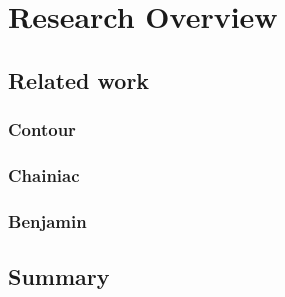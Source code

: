 \documentclass[../Main/thesis.tex]{subfiles}
\begin{document}
\chapter{Research Overview}\label{ch:research_overview}

\section{Related work}\label{sec:related}
\subsection{Contour}\label{sec:contour}

\subsection{Chainiac}\label{sec:chainiac}

\subsection{Benjamin}\label{sec:benjamin}

\section{Summary}\label{sec:researchoverview-summary}

\blankpage
\end{document}
